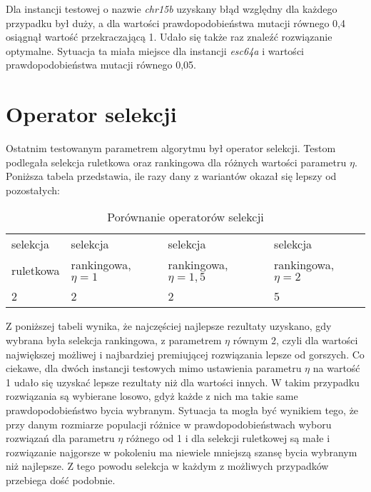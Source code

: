 Dla instancji testowej o nazwie \textit{chr15b} uzyskany błąd względny dla każdego przypadku był duży, a dla wartości prawdopodobieństwa mutacji równego 0,4 osiągnął wartość przekraczającą 1. Udało się także raz znaleźć rozwiązanie optymalne. Sytuacja ta miała miejsce dla instancji \textit{esc64a} i wartości prawdopodobieństwa mutacji równego 0,05.

\section{Operator selekcji}
Ostatnim testowanym parametrem algorytmu był operator selekcji. Testom podlegała selekcja ruletkowa oraz rankingowa dla różnych wartości parametru $\eta$. Poniższa tabela przedstawia, ile razy dany z wariantów okazał się lepszy od pozostałych:

\begin{table}[H]
\label{bramka_results}
\begin{center}
\begin{tabular}{l l l l}
\hline
selekcja & selekcja & selekcja & selekcja\\
ruletkowa & rankingowa, $\eta = 1$ & rankingowa, $\eta = 1,5$ & rankingowa, $\eta = 2$\\
\hline
2 & 2 & 2 & 5\\
\hline
\end{tabular}
\end{center}
\caption{Porównanie operatorów selekcji}
\end{table}

Z poniższej tabeli wynika, że najczęściej najlepsze rezultaty uzyskano, gdy wybrana była selekcja rankingowa, z parametrem $\eta$ równym 2, czyli dla wartości największej możliwej i najbardziej premiującej rozwiązania lepsze od gorszych. Co ciekawe, dla dwóch instancji testowych  mimo ustawienia parametru $\eta$ na wartość 1 udało się uzyskać lepsze rezultaty niż dla wartości innych. W takim przypadku rozwiązania są wybierane losowo, gdyż każde z nich ma takie same prawdopodobieństwo bycia wybranym. Sytuacja ta mogła być wynikiem tego, że przy danym rozmiarze populacji różnice w prawdopodobieństwach wyboru rozwiązań dla parametru $\eta$ różnego od 1 i dla selekcji ruletkowej są małe i rozwiązanie najgorsze w pokoleniu ma niewiele mniejszą szansę bycia wybranym niż najlepsze. Z tego powodu selekcja w każdym z możliwych przypadków przebiega dość podobnie.

